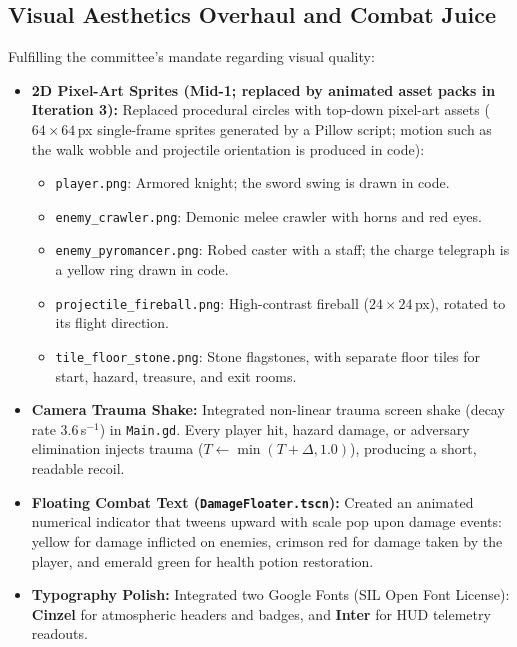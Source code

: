 \subsection{Visual Aesthetics Overhaul and Combat Juice}
Fulfilling the committee's mandate regarding visual quality:
\begin{itemize}
    \item \textbf{2D Pixel-Art Sprites (Mid-1; replaced by animated asset packs in Iteration 3):} Replaced procedural circles with top-down pixel-art assets ($64\times64$\,px single-frame sprites generated by a Pillow script; motion such as the walk wobble and projectile orientation is produced in code):
    \begin{itemize}
        \item \texttt{player.png}: Armored knight; the sword swing is drawn in code.
        \item \texttt{enemy\_crawler.png}: Demonic melee crawler with horns and red eyes.
        \item \texttt{enemy\_pyromancer.png}: Robed caster with a staff; the charge telegraph is a yellow ring drawn in code.
        \item \texttt{projectile\_fireball.png}: High-contrast fireball ($24\times24$\,px), rotated to its flight direction.
        \item \texttt{tile\_floor\_stone.png}: Stone flagstones, with separate floor tiles for start, hazard, treasure, and exit rooms.
    \end{itemize}
    \item \textbf{Camera Trauma Shake:} Integrated non-linear trauma screen shake (decay rate $3.6$\,s$^{-1}$) in \texttt{Main.gd}. Every player hit, hazard damage, or adversary elimination injects trauma ($T \leftarrow \min(T + \Delta, 1.0)$), producing a short, readable recoil.
    \item \textbf{Floating Combat Text (\texttt{DamageFloater.tscn}):} Created an animated numerical indicator that tweens upward with scale pop upon damage events: yellow for damage inflicted on enemies, crimson red for damage taken by the player, and emerald green for health potion restoration.
    \item \textbf{Typography Polish:} Integrated two Google Fonts (SIL Open Font License): \textbf{Cinzel} for atmospheric headers and badges, and \textbf{Inter} for HUD telemetry readouts.
\end{itemize}

